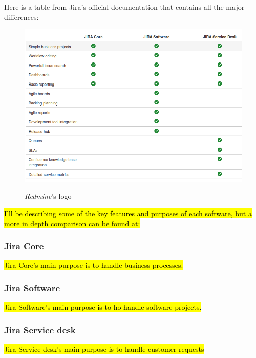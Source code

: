 		Here is a table from Jira's official documentation that contains all the major differences:
		\begin{figure}[H]
			\centering
			\includegraphics[width=\textwidth]{resources/jira_type}\\
			\caption{\textit{Redmine}'s logo}
		\end{figure}
	
		\hl{I'll be describing some of the key features and purposes of each software, but a more in depth comparison can be found at:}
		
		\subsubsection{Jira Core}
			\hl{Jira Core's main purpose is to handle business processes.}
			
		\subsubsection{Jira Software}
			\hl{Jira Software's main purpose is to ho handle software projects.}
		
		\subsubsection{Jira Service desk}
			\hl{Jira Service desk's main purpose is to handle customer requests}


